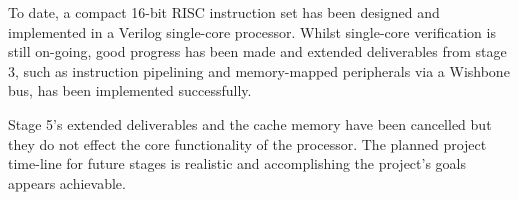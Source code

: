 To date, a compact 16-bit RISC instruction set has been designed and implemented in a Verilog single-core processor. Whilst single-core verification is still on-going, good progress has been made and extended deliverables from stage 3, such as instruction pipelining and memory-mapped peripherals via a Wishbone bus, has been implemented successfully.

Stage 5's extended deliverables and the cache memory have been cancelled but they do not effect the core functionality of the processor. 
The planned project time-line for future stages is  realistic and accomplishing the project's goals appears achievable.
